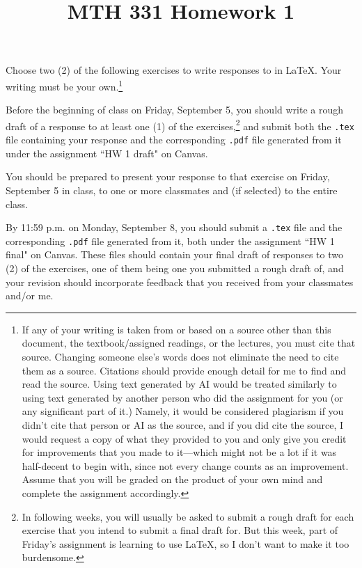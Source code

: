 \documentclass{article}
\title{MTH 331 Homework 1}
\author{}
\date{}
\begin{document}
\maketitle

\noindent
Choose two (2) of the following exercises to write responses to in \LaTeX.  Your writing must be your own.\footnote{If any of your writing is taken from or based on a source other than this document, the textbook/assigned readings, or the lectures, you must cite that source.  Changing someone else's words does not eliminate the need to cite them as a source.  Citations should provide enough detail for me to find and read the source.  Using text generated by AI would be treated similarly to using text generated by another person who did the assignment for you (or any significant part of it.)  Namely, it would be considered plagiarism if you didn't cite that person or AI as the source, and if you did cite the source, I would request a copy of what they provided to you and only give you credit for improvements that you made to it---which might not be a lot if it was half-decent to begin with, since not every change counts as an improvement.  Assume that you will be graded on the product of your own mind and complete the assignment accordingly.}

Before the beginning of class on Friday, September 5, you should write a rough draft of a response to at least one (1) of the exercises,\footnote{In following weeks, you will usually be asked to submit a rough draft for each exercise that you intend to submit a final draft for.  But this week, part of Friday's assignment is learning to use \LaTeX, so I don't want to make it too burdensome.} and submit both the \texttt{.tex} file containing your response and the corresponding \texttt{.pdf} file generated from it under the assignment ``HW 1 draft" on Canvas.

You should be prepared to present your response to that exercise on Friday, September 5 in class, to one or more classmates and (if selected) to the entire class.

By 11:59 p.m. on Monday, September 8, you should submit a \texttt{.tex} file and the corresponding \texttt{.pdf} file generated from it, both under the assignment ``HW 1 final" on Canvas.  These files should contain your final draft of responses to two (2) of the exercises, one of them being one you submitted a rough draft of, and your revision should incorporate feedback that you received from your classmates and/or me.
\end{document}
